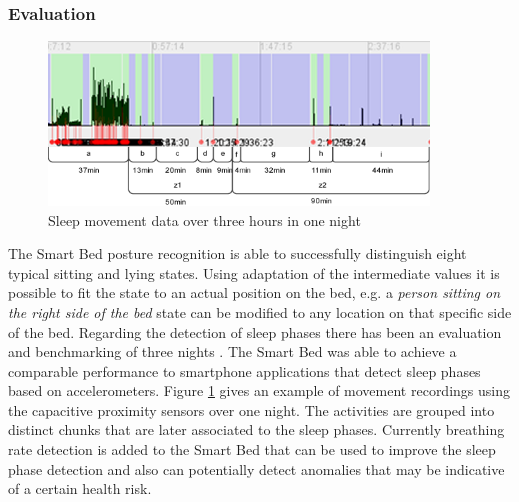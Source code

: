 \subsubsection{Evaluation}
\begin{figure}[h]
\centering
\includegraphics[width=0.9\textwidth]{images/smartbed_sleepphase}
\caption{Sleep movement data over three hours in one night \cite{Djakow2013movibed}}
\label{fig:smartbed_sleepphase}
\end{figure}
The Smart Bed posture recognition is able to successfully distinguish eight typical sitting and lying states. Using adaptation of the intermediate values it is possible to fit the state to an actual position on the bed, e.g. a \emph{person sitting on the right side of the bed} state can be modified to any location on that specific side of the bed. 
Regarding the detection of sleep phases there has been an evaluation and benchmarking of three nights \cite{Djakow2013movibed}. The Smart Bed was able to achieve a comparable performance to smartphone applications that detect sleep phases based on accelerometers. Figure \ref{fig:smartbed_sleepphase} gives an example of movement recordings using the capacitive proximity sensors over one night. The activities are grouped into distinct chunks that are later associated to the sleep phases. Currently breathing rate detection is added to the Smart Bed that can be used to improve the sleep phase detection and also can potentially detect anomalies that may be indicative of a certain health risk.
